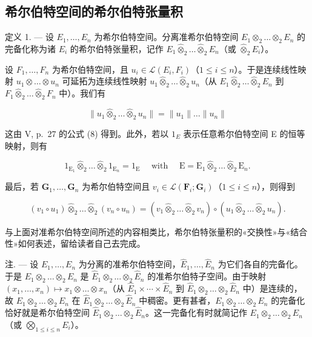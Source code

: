 \subsection{希尔伯特空间的希尔伯特张量积}

定义 1. --- 设 \(E_{1}, \ldots, E_{n}\) 为希尔伯特空间。分离准希尔伯特空间 \(E_{1} \otimes_{2} \ldots \otimes_{2} E_{n}\) 的完备化称为诸 \(E_{i}\) 的希尔伯特张量积，记作 \(E_{1} \hat{\otimes}_{2} \ldots \hat{\otimes}_{2} E_{n}\)（或 \(\hat{\otimes}_{2} E_{i}\)）。

设 \(F_{1}, \ldots, F_{n}\) 为希尔伯特空间，且 \(u_{i} \in \mathcal{L}(E_{i}, F_{i})\)（\(1 \leqslant i \leqslant n\)）。于是连续线性映射 \(u_{1} \otimes \ldots \otimes u_{n}\) 可延拓为连续线性映射 \(u_{1} \hat{\otimes}_{2} \ldots \hat{\otimes}_{2} u_{n}\)（从 \(E_{1} \hat{\otimes}_{2} \ldots \hat{\otimes}_{2} E_{n}\) 到 \(F_{1} \hat{\otimes}_{2} \ldots \hat{\otimes}_{2} F_{n}\) 中）。我们有

\[
\| u _ {1} \hat {\otimes} _ {2} \dots \hat {\otimes} _ {2} u _ {n} \| = \| u _ {1} \| \dots \| u _ {n} \|\tag{10}
\]

这由 V, p.~27 的公式 (8) 得到。此外，若以 \(1_{E}\) 表示任意希尔伯特空间 E 的恒等映射，则有

\[
1 _ {\mathrm{E} _ {1}} \hat {\otimes} _ {2} \dots \hat {\otimes} _ {2} 1 _ {\mathrm{E} _ {n}} = 1 _ {\mathrm{E}} \quad \text { with } \quad \mathrm{E} = \mathrm{E} _ {1} \hat {\otimes} _ {2} \dots \hat {\otimes} _ {2} \mathrm{E} _ {n}.\tag{11}
\]

最后，若 \(\mathbf{G}_1, \ldots, \mathbf{G}_n\) 为希尔伯特空间且 \(v_i \in \mathcal{L}(\mathbf{F}_i; \mathbf{G}_i)\)（\(1 \leqslant i \leqslant n\)），则得到

\[
\left(v _ {1} \circ u _ {1}\right) \hat {\otimes} _ {2} \dots \hat {\otimes} _ {2} \left(v _ {n} \circ u _ {n}\right) = \left(v _ {1} \hat {\otimes} _ {2} \dots \hat {\otimes} _ {2} v _ {n}\right) \circ \left(u _ {1} \hat {\otimes} _ {2} \dots \hat {\otimes} _ {2} u _ {n}\right).\tag{12}
\]

与上面对准希尔伯特空间所述的内容相类比，希尔伯特张量积的«交换性»与«结合性»如何表述，留给读者自己去完成。

注. --- 设 \(E_{1}, \ldots, E_{n}\) 为分离的准希尔伯特空间，\(\hat{E}_{1}, \ldots, \hat{E}_{n}\) 为它们各自的完备化。于是 \(E_{1} \otimes_{2} \ldots \otimes_{2} E_{n}\) 是 \(\hat{E}_{1} \otimes_{2} \ldots \otimes_{2} \hat{E}_{n}\) 的准希尔伯特子空间。由于映射 \((x_{1}, \ldots, x_{n}) \mapsto x_{1} \otimes \ldots \otimes x_{n}\)（从 \(\hat{E}_{1} \times \cdots \times \hat{E}_{n}\) 到 \(\hat{E}_{1} \otimes_{2} \ldots \otimes_{2} \hat{E}_{n}\) 中）是连续的，故 \(E_{1} \otimes_{2} \ldots \otimes_{2} E_{n}\) 在 \(\hat{E}_{1} \otimes_{2} \ldots \otimes_{2} \hat{E}_{n}\) 中稠密。更有甚者，\(E_{1} \otimes_{2} \ldots \otimes_{2} E_{n}\) 的完备化恰好就是希尔伯特空间 \(\hat{E}_{1} \otimes_{2} \ldots \otimes_{2} \hat{E}_{n}\)。这一完备化有时就简记作 \(E_{1} \otimes_{2} \ldots \otimes_{2} E_{n}\)（或 \(\bigotimes_{1 \leq i \leq n} E_{i}\)）。

